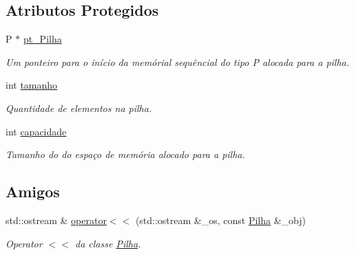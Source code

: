 \subsection*{Atributos Protegidos}
\begin{DoxyCompactItemize}
\item 
\hypertarget{class_pilha_a352bfedefc897a200334188781ed0baa}{P $\ast$ \hyperlink{class_pilha_a352bfedefc897a200334188781ed0baa}{pt\-\_\-\-Pilha}}\label{class_pilha_a352bfedefc897a200334188781ed0baa}

\begin{DoxyCompactList}\small\item\em Um ponteiro para o início da memórial sequêncial do tipo P alocada para a pilha. \end{DoxyCompactList}\item 
\hypertarget{class_pilha_a6a54f2a75f0ef3eaa57cd04f21df2992}{int \hyperlink{class_pilha_a6a54f2a75f0ef3eaa57cd04f21df2992}{tamanho}}\label{class_pilha_a6a54f2a75f0ef3eaa57cd04f21df2992}

\begin{DoxyCompactList}\small\item\em Quantidade de elementos na pilha. \end{DoxyCompactList}\item 
\hypertarget{class_pilha_a35f227f2a669f37692c7114cc3766b62}{int \hyperlink{class_pilha_a35f227f2a669f37692c7114cc3766b62}{capacidade}}\label{class_pilha_a35f227f2a669f37692c7114cc3766b62}

\begin{DoxyCompactList}\small\item\em Tamanho do do espaço de memória alocado para a pilha. \end{DoxyCompactList}\end{DoxyCompactItemize}
\subsection*{Amigos}
\begin{DoxyCompactItemize}
\item 
\hypertarget{class_pilha_a8d3b7befae3f938343e0485de88f9b07}{std\-::ostream \& \hyperlink{class_pilha_a8d3b7befae3f938343e0485de88f9b07}{operator$<$$<$} (std\-::ostream \&\-\_\-os, const \hyperlink{class_pilha}{Pilha} \&\-\_\-obj)}\label{class_pilha_a8d3b7befae3f938343e0485de88f9b07}

\begin{DoxyCompactList}\small\item\em Operator $<$$<$ da classe \hyperlink{class_pilha}{Pilha}. \end{DoxyCompactList}\end{DoxyCompactItemize}


